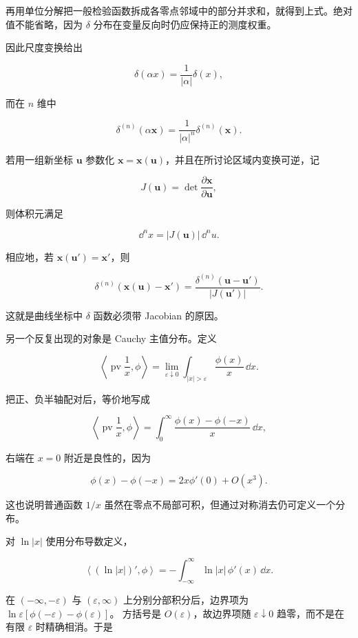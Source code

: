 再用单位分解把一般检验函数拆成各零点邻域中的部分并求和，就得到上式。绝对值不能省略，因为 $\delta$ 分布在变量反向时仍应保持正的测度权重。

因此尺度变换给出

\[
\delta(\alpha x)=\frac1{|\alpha|}\delta(x),
\]

而在 $n$ 维中

\[
\boxed{
\delta^{(n)}(\alpha\mathbf x)
=\frac1{|\alpha|^n}\delta^{(n)}(\mathbf x)
}.
\]

若用一组新坐标 $\mathbf u$ 参数化 $\mathbf x=\mathbf x(\mathbf u)$，并且在所讨论区域内变换可逆，记

\[
J(\mathbf u)=\det\frac{\partial\mathbf x}{\partial\mathbf u},
\]

则体积元满足

\[
\dd^n x=|J(\mathbf u)|\,\dd^n u.
\]

相应地，若 $\mathbf x(\mathbf u')=\mathbf x'$，则

\[
\boxed{
\delta^{(n)}(\mathbf x(\mathbf u)-\mathbf x')
=\frac{\delta^{(n)}(\mathbf u-\mathbf u')}{|J(\mathbf u')|}
}.
\]

这就是曲线坐标中 $\delta$ 函数必须带 Jacobian 的原因。

另一个反复出现的对象是 Cauchy 主值分布。定义

\begin{equation*}\boxed{
\left\langle\operatorname{pv}\frac1x,\phi\right\rangle
=\lim_{\varepsilon\downarrow0}
\int_{|x|>\varepsilon}\frac{\phi(x)}x\,\dd x
}.\end{equation*}

把正、负半轴配对后，等价地写成

\[
\left\langle\operatorname{pv}\frac1x,\phi\right\rangle
=\int_0^\infty\frac{\phi(x)-\phi(-x)}x\,\dd x,
\]

右端在 $x=0$ 附近是良性的，因为

\[
\phi(x)-\phi(-x)=2x\phi'(0)+O(x^3).
\]

这也说明普通函数 $1/x$ 虽然在零点不局部可积，但通过对称消去仍可定义一个分布。

对 $\ln|x|$ 使用分布导数定义，

\[
\left\langle(\ln|x|)',\phi\right\rangle
=-\int_{-\infty}^{\infty}\ln|x|\,\phi'(x)\,\dd x.
\]

在 $(-\infty,-\varepsilon)$ 与 $(\varepsilon,\infty)$ 上分别分部积分后，边界项为
$\ln\varepsilon[\phi(-\varepsilon)-\phi(\varepsilon)]$。
方括号是 $O(\varepsilon)$，故边界项随 $\varepsilon\downarrow0$ 趋零，而不是在有限 $\varepsilon$ 时精确相消。于是

